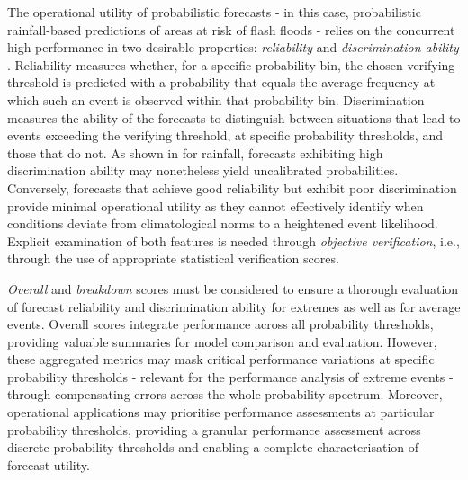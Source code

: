 The  operational utility of probabilistic forecasts - in this case, probabilistic rainfall-based predictions of areas at risk of flash floods - relies on the concurrent high performance in two desirable properties: \textit{reliability} and \textit{discrimination ability} \citep{Jolliffe_2012, Wilks_2020}. Reliability measures whether, for a specific probability bin, the chosen verifying threshold is predicted with a probability that equals the average frequency at which such an event is observed within that probability bin. Discrimination measures the ability of the forecasts to distinguish between situations that lead to events exceeding the verifying threshold, at specific probability thresholds, and those that do not. As shown in \citet{Pillosu_2025} for rainfall, forecasts exhibiting high discrimination ability may nonetheless yield uncalibrated probabilities. Conversely, forecasts that achieve good reliability but exhibit poor discrimination provide minimal operational utility as they cannot effectively identify when conditions deviate from climatological norms to a heightened event likelihood. Explicit examination of both features is needed through \textit{objective verification}, i.e., through the use of appropriate statistical verification scores.

\textit{Overall}  and \textit{breakdown} scores must be considered to ensure a thorough evaluation of forecast reliability and discrimination ability for extremes as well as for average events. Overall scores integrate performance across all probability thresholds, providing valuable summaries for model comparison and evaluation. However, these aggregated metrics may mask critical performance variations at specific probability thresholds - relevant for the performance analysis of extreme events - through compensating errors across the whole probability spectrum. Moreover, operational applications may prioritise performance assessments at particular probability thresholds, providing a granular performance assessment across discrete probability thresholds and enabling a complete characterisation of forecast utility.

